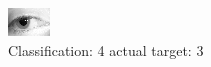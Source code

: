 \begin{figure}[h!]
\begin{center}
\includegraphics[width=0.60\columnwidth]{figures/ID1371_class_4_target_3.png}
\end{center}
\caption{ Classification: 4 actual target: 3}
\label{fig:ID1371_class_4_target_3}
\end{figure}
